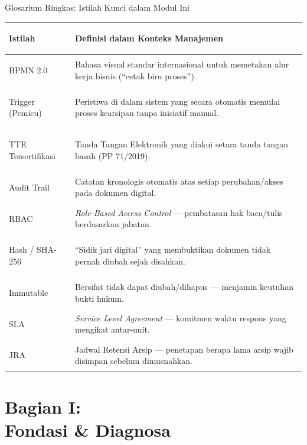 \documentclass[aspectratio=169,11pt]{beamer}
\begin{document}
\begin{frame}{Glosarium Ringkas: Istilah Kunci dalam Modul Ini}
    \vspace{0.2cm}
    \begin{table}
        \centering
        \scriptsize
        \begin{tabularx}{\textwidth}{@{} >{\bfseries\raggedright\arraybackslash}p{3.2cm} X @{}}
            \toprule
            \textbf{Istilah} & \textbf{Definisi dalam Konteks Manajemen} \\
            \midrule
            BPMN 2.0 & Bahasa visual standar internasional untuk memetakan alur kerja bisnis (``cetak biru proses''). \\
            Trigger (Pemicu) & Peristiwa di dalam sistem yang secara otomatis memulai proses kearsipan tanpa inisiatif manual. \\
            TTE Tersertifikasi & Tanda Tangan Elektronik yang diakui setara tanda tangan basah (PP 71/2019). \\
            Audit Trail & Catatan kronologis otomatis atas setiap perubahan/akses pada dokumen digital. \\
            RBAC & \textit{Role-Based Access Control} --- pembatasan hak baca/tulis berdasarkan jabatan. \\
            Hash / SHA-256 & ``Sidik jari digital'' yang membuktikan dokumen tidak pernah diubah sejak disahkan. \\
            Immutable & Bersifat tidak dapat diubah/dihapus --- menjamin keutuhan bukti hukum. \\
            SLA & \textit{Service Level Agreement} --- komitmen waktu respons yang mengikat antar-unit. \\
            JRA & Jadwal Retensi Arsip --- penetapan berapa lama arsip wajib disimpan sebelum dimusnahkan. \\
            \bottomrule
        \end{tabularx}
    \end{table}
\end{frame}


\section{Bagian I:\\Fondasi \& Diagnosa}
\end{document}
